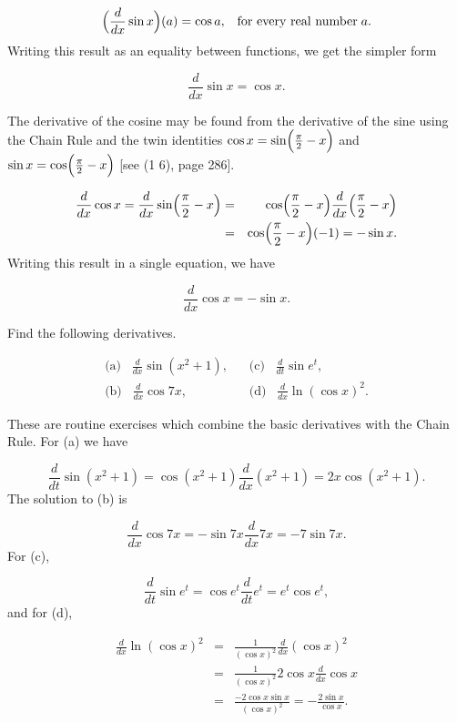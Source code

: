 $$
\Bigl (\frac{d}{dx} \sin x \Bigr) (a) = \cos a, \;\;\;\mbox{for every real number}\; a.
$$
\noindent Writing this result as an equality between functions, we get the simpler form

\begin{theorem} %
$$
\frac{d}{dx} \sin x= \cos x.
$$
\end{theorem}

The derivative of the cosine may be found from the derivative of the sine using the Chain Rule
and the twin identities $\cos x = \sin \Bigl(\frac{\pi}{2} - x \Bigr)$ and $\sin x = \cos \Bigl(\frac{\pi}{2} - x \Bigr)$ [see (1 6), page 286].


\begin{eqnarray*}
\frac{d}{dx} \cos x = \frac{d}{dx} \sin \Bigl(\frac{\pi}{2} - x \Bigr) 
&=& \cos \Bigl(\frac{\pi}{2} - x \Bigr) \frac{d}{dx} \Bigl(\frac{\pi}{2} - x \Bigr) \\
&=& \cos \Bigl(\frac{\pi}{2} - x \Bigr) (-1) = - \sin x.
\end{eqnarray*}
\noindent Writing this result in a single equation, we have

\begin{theorem} %
$$
\frac{d}{dx} \cos x = - \sin x.  
$$
\end{theorem}

\begin{example}
Find the following derivatives.

$$
\begin{array}{ll}
\mbox{(a)}\;\;\; \frac{d}{dx} \sin(x^{2} + 1), &\;\;\; \mbox{(c)}\;\;\; \frac{d}{dt} \sin e^{t}, \\
\mbox{(b)}\;\;\; \frac{d}{dx} \cos 7x,            &\;\;\; \mbox{(d)}\;\;\; \frac{d}{dx} \ln (\cos x)^2.
\end{array}
$$

These are routine exercises which combine the basic derivatives with the Chain Rule. 
For (a) we have 

$$
\frac{d}{dt} \sin(x^2 + 1 ) = \cos(x^2 + 1 ) \frac{d}{dx} (x^{2} + 1 ) = 2x \cos(x^{2} + 1 ).
$$
\noindent The solution to (b) is

$$
\frac{d}{dx} \cos 7x = - \sin 7x \frac{d}{dx} 7x = - 7 \sin 7x. 
$$
\noindent For (c), 

$$
\frac{d}{dt} \sin e^{t} = \cos e^{t} \frac{d}{dt} e^{t} = e^{t} \cos e^{t}, 
$$
\noindent and for (d),


\begin{eqnarray*}
\frac{d}{dx} \ln (\cos x)^2 &=& \frac{1}{(\cos x)^{2}} \frac{d}{dx} (\cos x)^2 \\
                                       &=& \frac{1}{(\cos x)^{2}} 2 \cos x \frac{d}{dx} \cos x \\
                                       &=& \frac{-2\cos x \sin x}{(\cos x)^{2}} = -\frac{2 \sin x}{\cos x}.
\end{eqnarray*}
\end{example}

